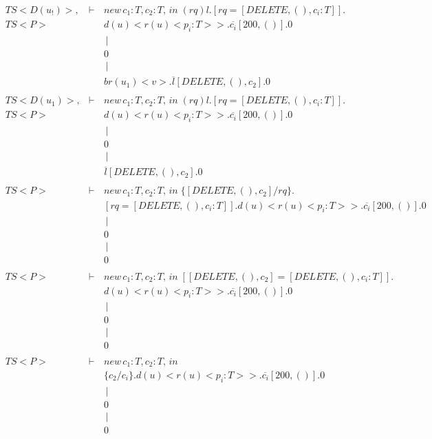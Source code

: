 \begin{eqnarray*}
 \ TS<D(u_!)>, &\vdash\,& new\,c_1:T,c_2:T,\,in\; (rq)l.[rq = [DELETE,(),c_i:T]]. \\
 \ TS<P>   &        & d(u)<r(u)<p_i:T>>.\overline{c_i}[200,()].0         \\
 \         &        &    \,|\,      \\
 \               &        & 0 \\
 \               &        &    \,|\,      \\
 \               &        & br(u_1)<v>.\overline{l}[DELETE,(),c_2].0 \\
 \               &        &          \\
 \ TS<D(u_1)>, &\vdash\,& new\,c_1:T,c_2:T,\,in\; (rq)l.[rq = [DELETE,(),c_i:T]]. \\
 \ TS<P>   &        & d(u)<r(u)<p_i:T>>.\overline{c_i}[200,()].0         \\
 \         &        &    \,|\,      \\
 \               &        & 0 \\
 \               &        &    \,|\,      \\
 \               &        & \overline{l}[DELETE,(),c_2].0 \\
 \               &        &          \\
 \ TS<P> &\vdash\,& new\,c_1:T,c_2:T,\,in\; \{[DELETE,(),c_2] / rq \}. \\
 \    &        & [rq = [DELETE,(),c_i:T]].d(u)<r(u)<p_i:T>>.\overline{c_i}[200,()].0         \\
 \         &        &    \,|\,      \\
 \               &        & 0 \\
 \               &        &    \,|\,      \\
 \               &        & 0 \\
 \               &        &          \\
 \ TS<P> &\vdash\,& new\,c_1:T,c_2:T,\,in\; [[DELETE,(),c_2] = [DELETE,(),c_i:T]].\\
 \    &        & d(u)<r(u)<p_i:T>>.\overline{c_i}[200,()].0         \\
 \         &        &    \,|\,      \\
 \               &        & 0 \\
 \               &        &    \,|\,      \\
 \               &        & 0 \\
 \               &        &          \\
 \ TS<P> &\vdash\,& new\,c_1:T,c_2:T,\,in\; \\
 \    &        & \{c_2 / c_i\}.d(u)<r(u)<p_i:T>>.\overline{c_i}[200,()].0         \\
 \          &        &    \,|\,      \\
 \               &        & 0 \\
 \               &        &    \,|\,      \\
 \               &        & 0 \\
\end{eqnarray*}
